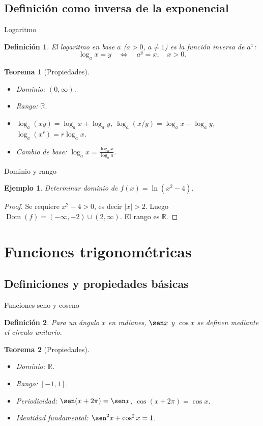 \documentclass[10pt, spanish]{beamer}
\newtheorem{definicion}{Definición}
\newtheorem{teorema}{Teorema}
\newtheorem{ejemplo}{Ejemplo}
\begin{document}
	\subsection{Definición como inversa de la exponencial}
	\begin{frame}{Logaritmo}
		\begin{definicion}
			El logaritmo en base $a$ ($a>0$, $a\neq1$) es la función inversa de $a^x$:
			\[
			\log_a x = y \quad \Longleftrightarrow \quad a^y = x, \quad x>0.
			\]
		\end{definicion}
		\begin{teorema}[Propiedades]
			\begin{itemize}
				\item Dominio: $(0,\infty)$.
				\item Rango: $\mathbb{R}$.
				\item $\log_a(xy)=\log_a x+\log_a y$, $\log_a(x/y)=\log_a x-\log_a y$, $\log_a(x^r)=r\log_a x$.
				\item Cambio de base: $\log_a x = \frac{\log_b x}{\log_b a}$.
			\end{itemize}
		\end{teorema}
	\end{frame}
	
	\begin{frame}{Dominio y rango}
		\begin{ejemplo}
			Determinar dominio de $f(x)=\ln(x^2-4)$.
		\end{ejemplo}
		\begin{proof}
			Se requiere $x^2-4>0$, es decir $|x|>2$. Luego $\operatorname{Dom}(f)=(-\infty,-2)\cup(2,\infty)$. El rango es $\mathbb{R}$.
		\end{proof}
	\end{frame}
	
	\section{Funciones trigonométricas}
	\subsection{Definiciones y propiedades básicas}
	\begin{frame}{Funciones seno y coseno}
		\begin{definicion}
			Para un ángulo $x$ en radianes, $\sen x$ y $\cos x$ se definen mediante el círculo unitario.
		\end{definicion}
		\begin{teorema}[Propiedades]
			\begin{itemize}
				\item Dominio: $\mathbb{R}$.
				\item Rango: $[-1,1]$.
				\item Periodicidad: $\sen(x+2\pi)=\sen x$, $\cos(x+2\pi)=\cos x$.
				\item Identidad fundamental: $\sen^2 x+\cos^2 x=1$.
			\end{itemize}
		\end{teorema}
	\end{frame}
	
\end{document}
